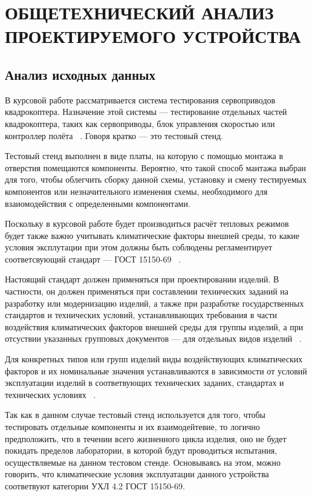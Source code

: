 \section{ОБЩЕТЕХНИЧЕСКИЙ АНАЛИЗ ПРОЕКТИРУЕМОГО УСТРОЙСТВА}
\subsection{Анализ исходных данных}

В курсовой работе рассматривается система тестирования сервоприводов квадрокоптера.
Назначение этой системы — тестирование отдельных частей квадрокоптера,
таких как сервоприводы,
блок управления скоростью или контроллер полёта ~\cite{Elector521}.
Говоря кратко — это тестовый стенд.


Тестовый стенд выполнен в виде платы,
на которую с помощью монтажа в отверстия помещаются компоненты.
Вероятно, что такой способ мантажа выбран для того,
чтобы облегчить сборку данной схемы,
установку и смену тестируемых компонентов
или незначительного изменения схемы,
необходимого для взаиомодействия с определенными компонентами.


Поскольку в курсовой работе будет производиться расчёт тепловых
режимов будет также важно учитывать климатические факторы внешней
среды, то какие условия эксплутации при этом должны быть соблюдены
регламентирует соответсвующий стандарт — ГОСТ 15150-69
~\cite{GOST-15150-69}.

Настоящий стандарт должен применяться при проектировании изделий.  В
частности, он должен применяться при составлении технических заданий
на разработку или модернизацию изделий, а также при разработке
государственных стандартов и технических условий, устанавливающих
требования в части воздействия климатических факторов внешней среды
для группы изделий, а при отсуствии указанных групповых документов —
для отдельных видов изделий ~\cite{GOST-15150-69}.

Для конкретных типов или групп изделий виды воздействующих
климатических факторов и их номинальные значения устанавливаются в
зависимости от условий эксплуатации изделий в соответвующих
технических заданих, стандартах и технических условиях ~\cite{GOST-15150-69}.


Так как в данном случае тестовый стенд используется для того,
чтобы тестировать отдельные компоненты и их взаимодейтевие,
то логично предположить,
что в течении всего жизненного цикла изделия,
оно не будет покидать пределов лаборатории,
в которой будут проводиться испытания,
осуществляемые на данном тестовом стенде.
Основываясь на этом, можно говорить,
что климатические условия эксплуатации данного устройства соответвуют категории УХЛ 4.2 ГОСТ 15150-69.


